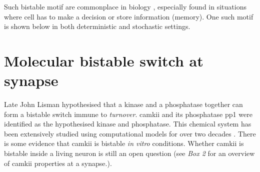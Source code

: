 \documentclass[]{resonance}
\begin{document}
{    \vspace{2mm}
    Such bistable motif are commonplace in biology \cite{ramakrishnan2008},
    especially found in situations where cell has to make a decision or store
    information (memory). One such motif is shown below in both deterministic
    and stochastic settings. 

    \vspace{2mm}
    \begin{center}
\end{center}
}


\section{Molecular bistable switch at synapse}\label{sec:molecular_switch}

Late John Lisman hypothesised that a kinase and a phosphatase together can form
a bistable switch immune to \emph{turnover}. \gls{camkii} and its phosphatase
\gls{pp1} were identified as the hypothesised kinase and phosphatase. This
chemical system has been extensively studied using computational models for over
two decades \cite{sandstorm}. There is some evidence that \gls{camkii} is
bistable \emph{in vitro} conditions. Whether \gls{camkii} is bistable inside a
living neuron is still an open question (see \textit{Box 2} for an overview of
\gls{camkii} properties at a synapse.).
\end{document}
